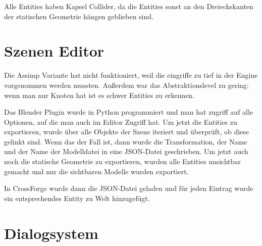 Alle Entities haben Kapsel Collider, da die Entities sonst an den Dreieckskanten der statischen Geometrie hängen geblieben sind.

\section{Szenen Editor}

Die Assimp Variante hat nicht funktioniert, weil die eingriffe zu tief in der Engine vorgenommen werden mussten. Außerdem war das Abstraktionslevel zu gering: wenn man nur Knoten hat ist es schwer Entities zu erkennen.

Das Blender Plugin wurde in Python programmiert und man hat zugriff auf alle Optionen, auf die man auch im Editor Zugriff hat. Um jetzt die Entities zu exportieren, wurde über alle Objekte der Szene iteriert und überprüft, ob diese gelinkt sind. Wenn das der Fall ist, dann wurde die Transformation, der Name und der Name der Modelldatei in eine JSON-Datei geschrieben. Um jetzt auch noch die statische Geometrie zu exportieren, wurden alle Entities unsichtbar gemacht und nur die sichtbaren Modelle wurden exportiert.

In CrossForge wurde dann die JSON-Datei geladen und für jeden Eintrag wurde ein entsprechendes Entity zu Welt hinzugefügt.

\section{Dialogsystem}